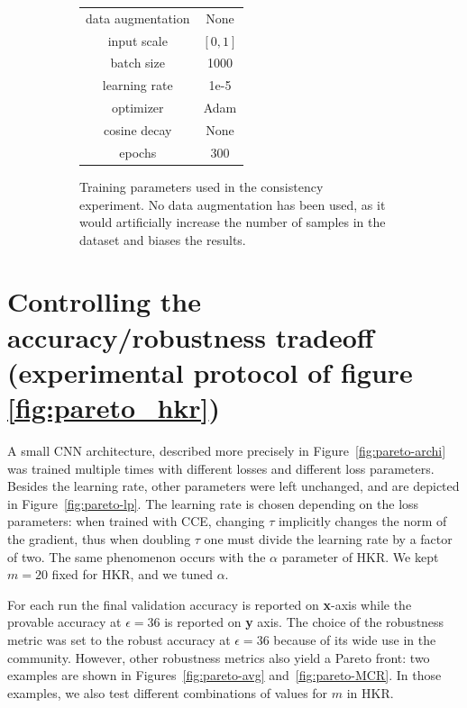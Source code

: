 \begin{figure}
\begin{subfigure}[b]{0.49\textwidth}
\begin{tabular}{cc}
                data augmentation & None \\
                input scale & $[0,1]$ \\
                batch size & 1000 \\
                learning rate & 1e-5 \\
                optimizer & Adam \\
                cosine decay & None \\
                epochs &  300 \\
                \hline
            \end{tabular}
            \caption{Training parameters used in the consistency experiment. No data augmentation has been used, as it would artificially increase the number of samples in the dataset and biases the results.}
            \label{fig:consistency-lp}
        \end{subfigure}
        \caption{}
    \end{figure}
    

\section{Controlling the accuracy/robustness tradeoff (experimental protocol  of figure \ref{fig:pareto_hkr})}\label{ap:pareto}

    
    A small CNN architecture, described more precisely in Figure~\ref{fig:pareto-archi} was trained multiple times with different losses and different loss parameters. Besides the learning rate, other parameters were left unchanged, and are depicted in Figure~\ref{fig:pareto-lp}. The learning rate is chosen depending on the loss parameters: when trained with CCE, changing $\tau$ implicitly changes the norm of the gradient, thus when doubling $\tau$ one must divide the learning rate by a factor of two. The same phenomenon occurs with the $\alpha$ parameter of HKR. We kept $m=20$ fixed for HKR, and we tuned $\alpha$.  
    
    For each run the final validation accuracy is reported on \textbf{x}-axis while the provable accuracy at $\epsilon=36$ is reported on \textbf{y} axis. The choice of the robustness metric was set to the robust accuracy at $\epsilon=36$ because of its wide use in the community. However,  other robustness metrics also yield a Pareto front: two examples are shown in Figures~\ref{fig:pareto-avg} and~\ref{fig:pareto-MCR}. In those examples, we also test different combinations of values for $m$ in HKR.  
    
